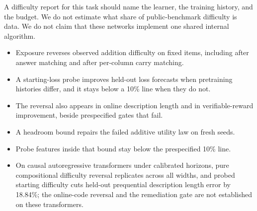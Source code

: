 A difficulty report for this task should name the learner, the training history, and the budget.
We do not estimate what share of public-benchmark difficulty is data.
We do not claim that these networks implement one shared internal algorithm.
\begin{itemize}
\item Exposure reverses observed addition difficulty on fixed items, including after answer matching and after per-column carry matching.
\item A starting-loss probe improves held-out loss forecasts when pretraining histories differ, and it stays below a 10\% line when they do not.
\item The reversal also appears in online description length and in verifiable-reward improvement, beside prespecified gates that fail.
\item A headroom bound repairs the failed additive utility law on fresh seeds.
\item Probe features inside that bound stay below the prespecified 10\% line.
\item On causal autoregressive transformers under calibrated horizons, pure compositional difficulty reversal replicates across all widths, and probed starting difficulty cuts held-out prequential description length error by 18.84\%; the online-code reversal and the remediation gate are not established on these transformers.
\end{itemize}
